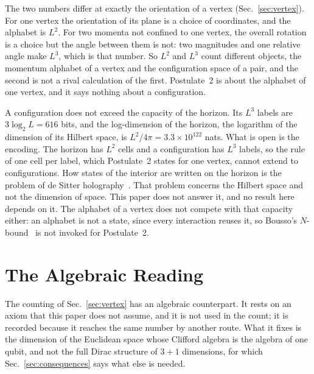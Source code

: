 \documentclass[aps,prd,twocolumn,superscriptaddress,nofootinbib]{revtex4-2}
\begin{document}
The two numbers differ at exactly the orientation of a vertex (Sec.~\ref{sec:vertex}). For one vertex the orientation of its plane is a choice of coordinates, and the alphabet is $L^2$. For two momenta not confined to one vertex, the overall rotation is a choice but the angle between them is not: two magnitudes and one relative angle make $L^3$, which is that number. So $L^2$ and $L^3$ count different objects, the momentum alphabet of a vertex and the configuration space of a pair, and the second is not a rival calculation of the first. Postulate~2 is about the alphabet of one vertex, and it says nothing about a configuration.

A configuration does not exceed the capacity of the horizon. Its $L^3$ labels are $3\log_2 L = 616$ bits, and the log-dimension of the horizon, the logarithm of the dimension of its Hilbert space, is $L^2/4\pi = 3.3\times10^{122}$ nats. What is open is the encoding. The horizon has $L^2$ cells and a configuration has $L^3$ labels, so the rule of one cell per label, which Postulate~2 states for one vertex, cannot extend to configurations. How states of the interior are written on the horizon is the problem of de Sitter holography~\cite{bousso1999,banksfischler2001,parikh2003}. That problem concerns the Hilbert space and not the dimension of space. This paper does not answer it, and no result here depends on it. The alphabet of a vertex does not compete with that capacity either: an alphabet is not a state, since every interaction reuses it, so Bousso's $N$-bound~\cite{bousso2000} is not invoked for Postulate~2.

\section{The Algebraic Reading}
\label{sec:algebra}

The counting of Sec.~\ref{sec:vertex} has an algebraic counterpart. It rests on an axiom that this paper does not assume, and it is not used in the count; it is recorded because it reaches the same number by another route. What it fixes is the dimension of the Euclidean space whose Clifford algebra is the algebra of one qubit, and not the full Dirac structure of $3+1$ dimensions, for which Sec.~\ref{sec:consequences} says what else is needed.
\end{document}
